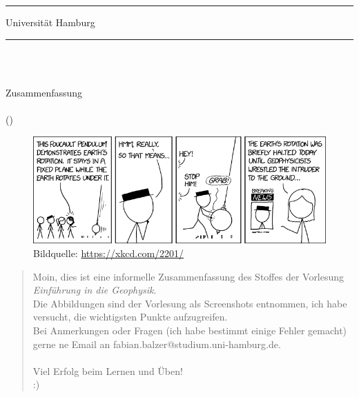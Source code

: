 
	\thispagestyle{empty}
	\rule{\linewidth}{1pt}
	
	\vspace{6pt}				%
	
	\begin{minipage}{0.5\textwidth}
		\begin{flushleft} 
		\Profs
		\end{flushleft}
	\end{minipage}
	\begin{minipage}{0.49\textwidth}
		\begin{flushright}
			Universität Hamburg
		\end{flushright}
	\end{minipage}

	\rule{\linewidth}{1pt}\\
	\begin{center}
		\huge{\textsf{\titel}}\\
\vspace{8pt}
\large{Zusammenfassung}\\
\small{\Autor}\\
\small{(\Version)}
\vspace{8pt}
	\end{center}

\begin{figure}[htbp]
    \centering
    \includegraphics[width=.73\textwidth]{Dateien/Bilder/00xkcd.png}
    \caption*{Bildquelle: \url{https://xkcd.com/2201/}}
\end{figure}
\vfill
\begin{abstract}
\noindent
Moin, dies ist eine informelle Zusammenfassung des Stoffes der Vorlesung \textit{Einführung in die Geophysik}.\\
Die Abbildungen sind der Vorlesung als Screenshots entnommen, ich habe versucht, die wichtigsten Punkte aufzugreifen.\\
Bei Anmerkungen oder Fragen (ich habe bestimmt einige Fehler gemacht) gerne ne Email an fabian.balzer@studium.uni-hamburg.de.\\\\
Viel Erfolg beim Lernen und Üben!\\
:)
\end{abstract}
\cfoot{\pagemark}